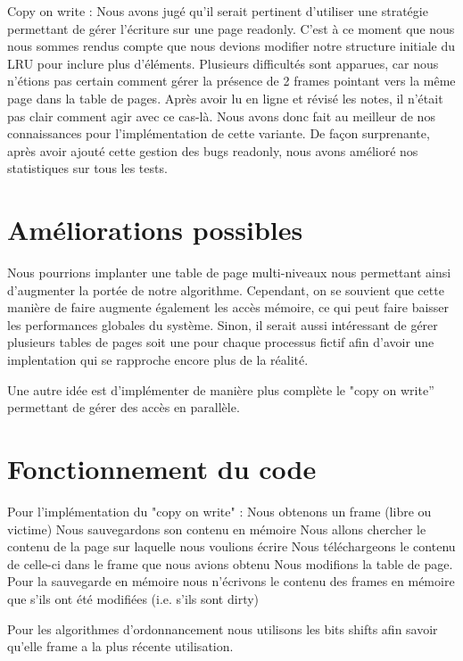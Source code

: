 \documentclass{article}
\begin{document}
\par
Copy on write : Nous avons jugé qu'il serait pertinent d'utiliser une stratégie permettant de gérer l’écriture sur une page readonly. C’est à ce moment que nous nous sommes rendus compte que nous devions modifier notre structure initiale du LRU pour inclure plus d’éléments. Plusieurs difficultés sont apparues, car nous n’étions pas certain comment gérer la présence de 2 frames pointant vers la même page dans la table de pages. Après avoir lu en ligne et révisé les notes, il n’était pas clair comment agir avec ce cas-là. Nous avons donc fait au meilleur de nos connaissances pour l’implémentation de cette variante. De façon surprenante, après avoir ajouté cette gestion des bugs readonly, nous avons amélioré nos statistiques sur tous les tests.



\section{Améliorations possibles}
Nous pourrions implanter une table de page multi-niveaux nous permettant ainsi d’augmenter la portée de notre algorithme. Cependant, on se souvient que cette manière de faire augmente également les accès mémoire, ce qui peut faire baisser les performances globales du système. Sinon, il serait aussi intéressant de gérer plusieurs tables de pages soit une pour chaque processus fictif afin d'avoir une implentation qui se rapproche encore plus de la réalité.

Une autre idée est d’implémenter de manière plus complète le "copy on write” permettant de gérer des accès en parallèle.

\section{Fonctionnement du code}

Pour l'implémentation du "copy on write" :
Nous obtenons un frame (libre ou victime)
Nous sauvegardons son contenu en mémoire
Nous allons chercher le contenu de la page sur laquelle nous voulions écrire 
Nous téléchargeons le contenu de celle-ci dans le frame que nous avions obtenu
Nous modifions la table de page. 
Pour la sauvegarde en mémoire nous n'écrivons le contenu des frames en mémoire que s'ils ont été modifiées (i.e. s’ils sont dirty)

\par 
Pour les algorithmes d'ordonnancement nous utilisons les bits shifts afin savoir qu'elle frame a la plus récente utilisation.
\end{document}

